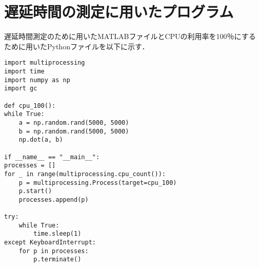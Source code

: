\chapter{遅延時間の測定に用いたプログラム}
遅延時間測定のために用いたMATLABファイルとCPUの利用率を100％にするために用いたPythonファイルを以下に示す．

\begin{lstlisting}[caption=cpu100.py]
import multiprocessing
import time
import numpy as np
import gc

def cpu_100():
while True:
    a = np.random.rand(5000, 5000)
    b = np.random.rand(5000, 5000)
    np.dot(a, b)

if __name__ == "__main__":
processes = []
for _ in range(multiprocessing.cpu_count()):
    p = multiprocessing.Process(target=cpu_100)
    p.start()
    processes.append(p)

try:
    while True:
        time.sleep(1)
except KeyboardInterrupt:
    for p in processes:
        p.terminate()

\end{lstlisting}
    
